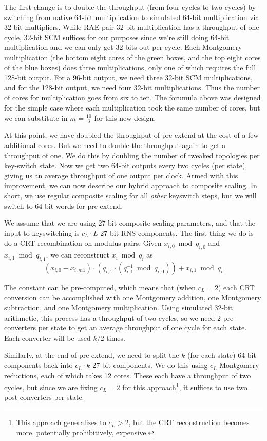 \documentclass[../../fheimpl.tex]{subfiles}
\begin{document}
The first change is to double the throughput (from four cycles to two cycles) by switching from native 64-bit multiplication to simulated 64-bit multiplication via 32-bit multipliers. While RAE-pair 32-bit multiplication has a throughput of one cycle, 32-bit SCM suffices for our purposes since we're still doing 64-bit multiplication and we can only get 32 bits out per cycle. Each Montgomery multiplication (the bottom eight cores of the green boxes, and the top eight cores of the blue boxes) does three multiplications, only one of which requires the full 128-bit output. For a 96-bit output, we need three 32-bit SCM multiplications, and for the 128-bit output, we need four 32-bit multiplications. Thus the number of cores for multiplication goes from six to ten. The forumula above was designed for the simple case where each multiplication took the same number of cores, but we can substitute in $m=\frac{10}{3}$ for this new design.

At this point, we have doubled the throughput of pre-extend at the cost of a few additional cores. But we need to double the throughput again to get a throughput of one. We do this by doubling the number of tweaked topologies per key-switch state. Now we get two 64-bit outputs every two cycles (per state), giving us an average throughput of one output per clock. Armed with this improvement, we can now describe our hybrid approach to composite scaling. In short, we use regular composite scaling for all \emph{other} keyswitch steps, but we will switch to 64-bit words for pre-extend.

We assume that we are using 27-bit composite scaling parameters, and that the input to keyswitching is $c_L\cdot L$ 27-bit RNS components. The first thing we do is do a CRT recombination on modulus pairs. Given $x_{i,0}\bmod q_{i,0}$ and $x_{i,1} \bmod q_{i,1}$, we can reconstruct $x_i\bmod q_i$ as
\[(x_{i,0}-x_{i,m1})\cdot (q_{i,1}\cdot (q_{i,1}^{-1}\bmod q_{i,0})) + x_{i,1} \bmod q_i\]

The constant can be pre-computed, which means that (when $c_L=2$) each CRT conversion can be accomplished with one Montgomery addition, one Montgomery subtraction, and one Montgomery multiplication. Using simulated 32-bit arithmetic, this process has a throughput of two cycles, so we need $2$ pre-converters per state to get an average throughput of one cycle for each state. Each converter will be used $k/2$ times.

Similarly, at the end of pre-extend, we need to split the $k$ (for each state) 64-bit components back into $c_L\cdot k$ 27-bit components. We do this using $c_L$ Montgomery reductions, each of which takes 12 cores. These each have a throughput of two cycles, but since we are fixing $c_L=2$ for this approach\footnote{This approach generalizes to $c_L>2$, but the CRT reconstruction becomes more, potentially prohibitively, expensive.}, it suffices to use two post-converters per state.
\end{document}
